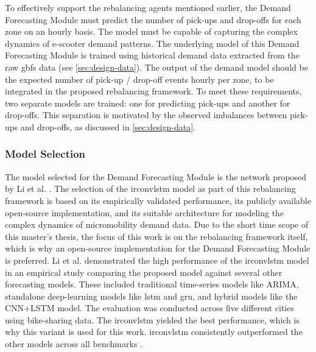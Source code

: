 To effectively support the rebalancing agents mentioned earlier, the Demand Forecasting Module must predict the number of pick-ups and drop-offs for each zone on an hourly basis.
The model must be capable of capturing the complex dynamics of e-scooter demand patterns.
The underlying model of this Demand Forecasting Module is trained using historical demand data extracted from the raw \gls{gbfs} data (see \autoref{sec:design-data}).
The output of the demand model should be the expected number of pick-up / drop-off events hourly per zone, to be integrated in the proposed rebalancing framework.
To meet these requirements, two separate models are trained: one for predicting pick-ups and another for drop-offs.
This separation is motivated by the observed imbalances between pick-ups and drop-offs, as discussed in \autoref{sec:design-data}.


\subsubsection{Model Selection}
The model selected for the Demand Forecasting Module is the  network proposed by Li et al. \cite{li_improving_2023}.
The selection of the \gls{irconvlstm} model as part of this rebalancing framework is based on its empirically validated performance, its publicly available open-source implementation, and its suitable architecture for modeling the complex dynamics of micromobility demand data.
Due to the short time scope of this master's thesis, the focus of this work is on the rebalancing framework itself, which is why an open-source implementation for the Demand Forecasting Module is preferred.
Li et al. demonstrated the high performance of the \gls{irconvlstm} model in an empirical study comparing the proposed model against several other forecasting models.
These included traditional time-series models like ARIMA, standalone deep-learning models like \gls{lstm} and \gls{gru}, and hybrid models like the CNN+LSTM model.
The evaluation was conducted across five different cities using bike-sharing data.
The \gls{irconvlstm} yielded the best performance, which is why this variant is used for this work.
\gls{irconvlstm} consistently outperformed the other models across all benchmarks \cite{li_improving_2023}.\\


